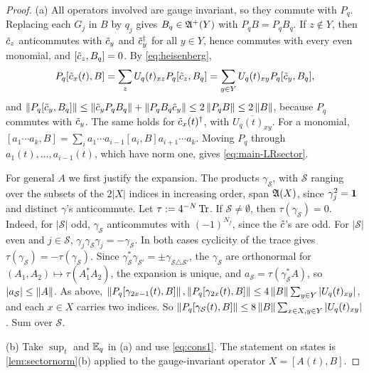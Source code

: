 \begin{proof}
(a) All operators involved are gauge invariant, so they commute with $P_q$.  Replacing each $G_j$ in $B$ by
$q_j$ gives $B_q\in\mathfrak{A}^+(Y)$ with $P_qB=P_qB_q$.  If $z\notin Y$, then $\tilde c_z$ anticommutes with $\tilde c_y$ and
$\tilde c_y^\dagger$ for all $y\in Y$, hence commutes with every even monomial, and $[\tilde c_z,B_q]=0$.  By
\eqref{eq:heisenberg},
\[
  P_q[\tilde c_x(t),B]=\sum_{z}U_q(t)_{xz}P_q[\tilde c_z,B_q]=\sum_{y\in Y}U_q(t)_{xy}P_q[\tilde c_y,B_q],
\]
and $\left\|P_q[\tilde c_y,B_q]\right\|\le\left\|\tilde c_yP_qB_q\right\|+\left\|P_qB_q\tilde c_y\right\|\le2\left\|P_qB\right\|\le2\left\|B\right\|$, because $P_q$
commutes with $\tilde c_y$.  The same holds for $\tilde c_x(t)^\dagger$, with $\overline{U_q(t)_{xy}}$.  For a monomial,
$[a_1\cdots a_k,B]=\sum_ia_1\cdots a_{i-1}[a_i,B]a_{i+1}\cdots a_k$.  Moving $P_q$ through
$a_1(t),\dots,a_{i-1}(t)$, which have norm one, gives \eqref{eq:main-LRsector}.

For general $A$ we first justify the expansion.  The products $\gamma_{\mathcal S}$, with $\mathcal S$ ranging over
the subsets of the $2|X|$ indices in increasing order, span $\mathfrak{A}(X)$, since $\gamma_j^2=\mathbf{1}$ and distinct
$\gamma$'s anticommute.  Let $\tau:=4^{-N}\operatorname{Tr}$.  If $\mathcal S\neq\emptyset$, then $\tau(\gamma_{\mathcal S})=0$.
Indeed, for $|\mathcal S|$ odd, $\gamma_{\mathcal S}$ anticommutes with $(-1)^{N_f}$, since the $\tilde c$'s are odd.  For
$|\mathcal S|$ even and $j\in\mathcal S$, $\gamma_j\gamma_{\mathcal S}\gamma_j=-\gamma_{\mathcal S}$.  In both cases
cyclicity of the trace gives $\tau(\gamma_{\mathcal S})=-\tau(\gamma_{\mathcal S})$.  Since
$\gamma_{\mathcal S}^*\gamma_{\mathcal S'}=\pm\gamma_{\mathcal S\triangle\mathcal S'}$, the $\gamma_{\mathcal S}$ are orthonormal for
$(A_1,A_2)\mapsto\tau(A_1^*A_2)$, the expansion is unique, and $a_{\mathcal S}=\tau(\gamma_{\mathcal S}^*A)$, so
$|a_{\mathcal S}|\le\left\|A\right\|$.  As above,
$\left\|P_q[\gamma_{2x-1}(t),B]\right\|,\left\|P_q[\gamma_{2x}(t),B]\right\|\le4\left\|B\right\|\sum_{y\in Y}|U_q(t)_{xy}|$, and each
$x\in X$ carries two indices.  So
$\left\|P_q[\gamma_{\mathcal S}(t),B]\right\|\le8\left\|B\right\|\sum_{x\in X,y\in Y}|U_q(t)_{xy}|$.  Sum over $\mathcal S$.

(b) Take $\sup_t$ and $\mathbb{E}_q$ in (a) and use \eqref{eq:cons1}.  The statement on states is
\cref{lem:sectornorm}(b) applied to the gauge-invariant operator $X=[A(t),B]$.


\end{proof}
